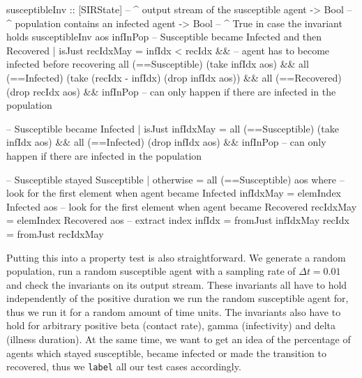 \begin{HaskellCode}
susceptibleInv :: [SIRState] -- ^ output stream of the susceptible agent 
               -> Bool       -- ^ population contains an infected agent
               -> Bool       -- ^ True in case the invariant holds
susceptibleInv aos infInPop
    -- Susceptible became Infected and then Recovered
    | isJust recIdxMay 
      = infIdx < recIdx &&  -- agent has to become infected before recovering
        all (==Susceptible) (take infIdx aos) && 
        all (==Infected) (take (recIdx - infIdx) (drop infIdx aos)) && 
        all (==Recovered) (drop recIdx aos) &&
        infInPop  -- can only happen if there are infected in the population

    -- Susceptible became Infected
    | isJust infIdxMay 
      = all (==Susceptible) (take infIdx aos) &&
        all (==Infected) (drop infIdx aos) &&
        infInPop -- can only happen if there are infected in the population

    -- Susceptible stayed Susceptible
    | otherwise = all (==Susceptible) aos
  where
    -- look for the first element when agent became Infected
    infIdxMay = elemIndex Infected aos
    -- look for the first element when agent became Recovered
    recIdxMay = elemIndex Recovered aos
    -- extract index
    infIdx = fromJust infIdxMay
    recIdx = fromJust recIdxMay
\end{HaskellCode}

Putting this into a property test is also straightforward. We generate a random population, run a random susceptible agent with a sampling rate of $\Delta t = 0.01$ and check the invariants on its output stream. These invariants all have to hold independently of the positive duration we run the random susceptible agent for, thus we run it for a random amount of time units. The invariants also have to hold for arbitrary positive beta (contact rate), gamma (infectivity) and delta (illness duration). At the same time, we want to get an idea of the percentage of agents which stayed susceptible, became infected or made the transition to recovered, thus we \texttt{label} all our test cases accordingly.

